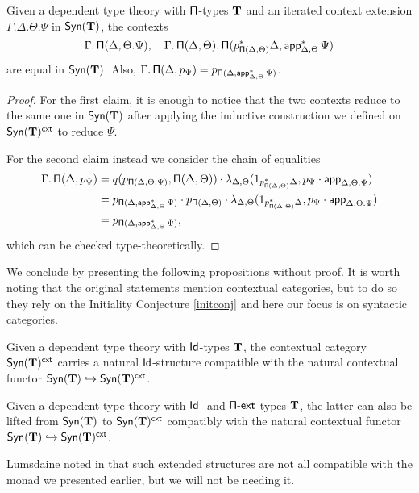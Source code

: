 \begin{lem}\label{piequal}
  Given a dependent type theory with $\operatorname{\mathsf{\Pi}}$-types $\operatorname{\mathbf{T}}$ and an iterated context
  extension $\Gamma.\Delta.\Theta.\Psi$ in $\mathsf{Syn}(\mathbf{T})$, the contexts
  \[\Gamma.\operatorname{\mathsf{\Pi}}(\Delta,\Theta.\Psi),\quad\Gamma.\operatorname{\mathsf{\Pi}}(\Delta,\Theta).\operatorname{\mathsf{\Pi}}(p^*_{\operatorname{\mathsf{\Pi}}(\Delta,\Theta)}\Delta,\operatorname{\mathsf{app}}^*_{\Delta,\Theta}\Psi)\]
  are equal in $\mathsf{Syn}(\mathbf{T})$. Also,
  $\Gamma.\operatorname{\mathsf{\Pi}}(\Delta,p_{\Psi})=p_{\operatorname{\mathsf{\Pi}}(\Delta,\operatorname{\mathsf{app}}^*_{\Delta,\Theta}\Psi)}$.
\end{lem}
\begin{proof}
  For the first claim, it is enough to notice that the two contexts reduce to
  the same one in $\mathsf{Syn}(\mathbf{T})$ after applying the inductive construction we defined
  on $\mathsf{Syn}(\mathbf{T})^{\operatorname{\mathsf{cxt}}}$ to reduce $\Psi$.

  \noindent
  For the second claim instead we consider the chain of equalities
  \begin{align*}
    \Gamma.\operatorname{\mathsf{\Pi}}(\Delta,p_{\Psi})
    &=q(p_{\operatorname{\mathsf{\Pi}}(\Delta,\Theta.\Psi)},\operatorname{\mathsf{\Pi}}(\Delta,\Theta))\cdot
    \lambda_{\Delta,\Theta}(1_{p^*_{\operatorname{\mathsf{\Pi}}(\Delta,\Theta)}\Delta},p_\Psi\cdot\operatorname{\mathsf{app}}_{\Delta,\Theta.\Psi}) \\
    &=p_{\operatorname{\mathsf{\Pi}}(\Delta,\operatorname{\mathsf{app}}^*_{\Delta,\Theta}\Psi)}\cdot
    p_{\operatorname{\mathsf{\Pi}}(\Delta,\Theta)}\cdot
    \lambda_{\Delta,\Theta}(1_{p^*_{\operatorname{\mathsf{\Pi}}(\Delta,\Theta)}\Delta},p_\Psi\cdot\operatorname{\mathsf{app}}_{\Delta,\Theta.\Psi}) \\
    &=p_{\operatorname{\mathsf{\Pi}}(\Delta,\operatorname{\mathsf{app}}^*_{\Delta,\Theta}\Psi)},
  \end{align*}
  which can be checked type-theoretically.
\end{proof}

  \noindent
We conclude by presenting the following propositions without proof. It is worth
noting that the original statements mention contextual categories, but to do so
they rely on the Initiality Conjecture \ref{initconj} and here our focus is on
syntactic categories.

\begin{lem}
  Given a dependent type theory with $\operatorname{\mathsf{Id}}$-types $\operatorname{\mathbf{T}}$, the contextual category
  $\mathsf{Syn}(\mathbf{T})^{\operatorname{\mathsf{cxt}}}$ carries a natural $\operatorname{\mathsf{Id}}$-structure compatible with the
  natural contextual functor $\mathsf{Syn}(\mathbf{T})\hookrightarrow\mathsf{Syn}(\mathbf{T})^{\operatorname{\mathsf{cxt}}}$.
\end{lem}

\begin{lem}[{\cite[Lemma 2.28]{KS19}}]
  Given a dependent type theory with $\operatorname{\mathsf{Id}}$- and $\operatorname{\mathsf{\Pi-ext}}$-types
  $\operatorname{\mathbf{T}}$, the latter can also be lifted from $\mathsf{Syn}(\mathbf{T})$ to
  $\mathsf{Syn}(\mathbf{T})^{\operatorname{\mathsf{cxt}}}$ compatibly with the natural contextual functor
  $\mathsf{Syn}(\mathbf{T})\hookrightarrow\mathsf{Syn}(\mathbf{T})^{\operatorname{\mathsf{cxt}}}$.
\end{lem}

\begin{rmk}
  Lumsdaine noted in \cite[Rem.\ 1.3.1]{Lum10} that such extended structures are
  not all compatible with the monad we presented earlier, but we will not be
  needing it.
\end{rmk}
